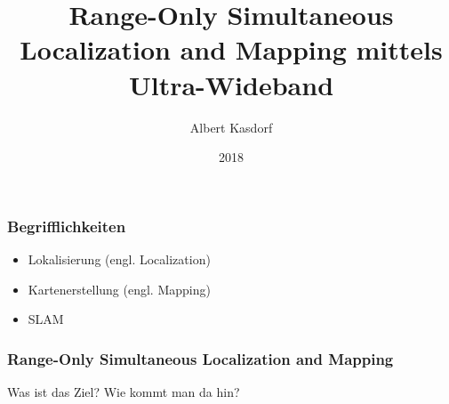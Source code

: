 \documentclass{beamer}
\title[RO-SLAM mittels UWB]{Range-Only Simultaneous Localization and Mapping mittels Ultra-Wideband}
\author{Albert Kasdorf}
\institute[FH Aachen]
{
	FH Aachen\\
	Fachbereich Elektrotechnik und Informationstechnik\\
	Ingenieur-Informatik
}
\date{2018}
\begin{document}
%
%
\frame{\titlepage}


%
%


%
% 
%
\begin{frame}
	\frametitle{Begrifflichkeiten}
	\begin{itemize}
		\item Lokalisierung (engl. Localization)
		\item Kartenerstellung (engl. Mapping)
		\item SLAM
	\end{itemize}
\end{frame}


%
% 
%
\begin{frame}
	\frametitle{Range-Only Simultaneous Localization and Mapping}
	Was ist das Ziel?
	Wie kommt man da hin?
\end{frame}
\end{document}
